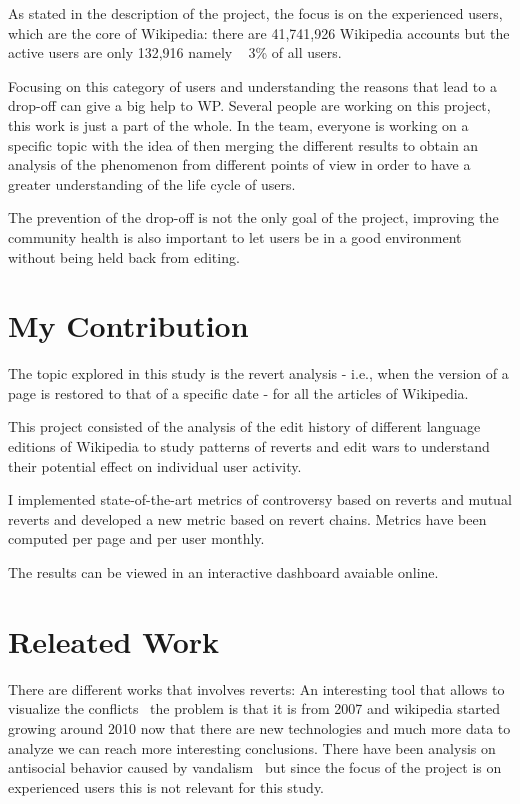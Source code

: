 As stated in the description of the project, the focus is on the experienced users, which are the
core of Wikipedia: there are 41,741,926 Wikipedia accounts but the active users are only 132,916
namely
~ 3\% of all users. 

Focusing on this category of users and understanding the reasons that lead to a drop-off can give a
big help to WP. Several people are working on this project, this work is just a part of the whole.
In the team, everyone is working on a specific topic with the idea of then merging the different
results to obtain an analysis of the phenomenon from different points of view in order to have a
greater understanding of the life cycle of users.  

The prevention of the drop-off is not the only goal of the project, improving the community health
is also important to let users be in a good environment without being held back from editing. 

\section{My Contribution}
\label{sec:project}
The topic explored in this study is the revert analysis - i.e., when the version of a page is
restored to that of a specific date - for all the articles of Wikipedia.

This project consisted of the analysis of the edit history of different language editions of
Wikipedia to study patterns of reverts and edit wars to understand their potential effect on
individual user activity.

I implemented state-of-the-art metrics of controversy based on reverts and mutual reverts and
developed a new metric based on revert chains. Metrics have been computed per page and per user
monthly.

The results can be viewed in an interactive dashboard avaiable online.
\section{Releated Work}
There are different works that involves reverts: An interesting tool that allows to visualize the
conflicts~\cite{Suh2007} the problem is that it is from 2007 and wikipedia started growing around
2010 now that there are new technologies and much more data to analyze we can reach more interesting
conclusions. There have been analysis on antisocial behavior caused by vandalism~\cite{Kiesel2017}
but since the focus of the project is on experienced users this is not relevant for this study.  
